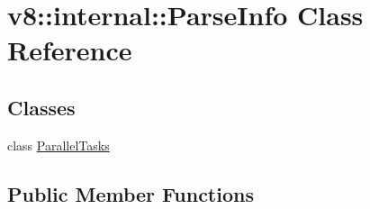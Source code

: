 \hypertarget{classv8_1_1internal_1_1ParseInfo}{}\section{v8\+:\+:internal\+:\+:Parse\+Info Class Reference}
\label{classv8_1_1internal_1_1ParseInfo}
\subsection*{Classes}
\begin{DoxyCompactItemize}
\item 
class \mbox{\hyperlink{classv8_1_1internal_1_1ParseInfo_1_1ParallelTasks}{Parallel\+Tasks}}
\end{DoxyCompactItemize}
\subsection*{Public Member Functions}
